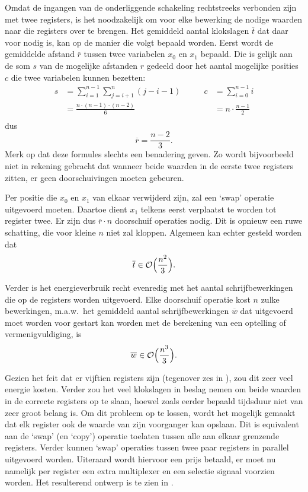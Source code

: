 Omdat de ingangen van de onderliggende schakeling rechtstreeks verbonden zijn met twee registers, is het noodzakelijk om voor elke bewerking de nodige waarden naar die registers over te brengen. Het gemiddeld aantal klokslagen $\overline{t}$ dat daar voor nodig is, kan op de manier die volgt bepaald worden. Eerst wordt de gemiddelde afstand $\overline{r}$ tussen twee variabelen $x_0$ en $x_1$ bepaald. Die is gelijk aan de som $s$ van de mogelijke afstanden $r$ gedeeld door het aantal mogelijke posities $c$ die twee variabelen kunnen bezetten:
\[\begin{aligned}
s	&= \sum_{i = 1}^{n - 1} \sum_{j = i + 1}^n (j - i - 1)
	&\qquad c	&= \sum_{i = 0}^{n - 1} i\\
	&= \frac{n \cdot (n - 1) \cdot (n - 2)}{6}
	&	&= n \cdot \frac{n - 1}{2}\\
\end{aligned}\]
dus
\[\overline{r}	= \frac{n - 2}{3}.\]
Merk op dat deze formules slechts een benadering geven. Zo wordt bijvoorbeeld niet in rekening gebracht dat wanneer beide waarden in de eerste twee registers zitten, er geen doorschuivingen moeten gebeuren.

Per positie die $x_0$ en $x_1$ van elkaar verwijderd zijn, zal een `swap' operatie uitgevoerd moeten. Daartoe dient $x_1$ telkens eerst verplaatst te worden tot register twee. Er zijn dus $\overline{r} \cdot n$ doorschuif operaties nodig. Dit is opnieuw een ruwe schatting, die voor kleine $n$ niet zal kloppen. Algemeen kan echter gesteld worden dat
\[\overline{t} \in \mathcal{O} \Bigl( \frac{n^2}{3} \Bigr).\]

Verder is het energieverbruik recht evenredig met het aantal schrijfbewerkingen die op de registers worden uitgevoerd. Elke doorschuif operatie kost $n$ zulke bewerkingen, m.a.w.\ het gemiddeld aantal schrijfbewerkingen $\overline{w}$ dat uitgevoerd moet worden voor gestart kan worden met de berekening van een optelling of vermenigvuldiging, is
\[\overline{w} \in \mathcal{O} \Bigl( \frac{n^3}{3} \Bigr).\]

Gezien het feit dat er vijftien registers zijn (tegenover zes in \cite{lee}), zou dit zeer veel energie kosten. Verder zou het veel klokslagen in beslag nemen om beide waarden in de correcte registers op te slaan, hoewel zoals eerder bepaald tijdsduur niet van zeer groot belang is. Om dit probleem op te lossen, wordt het mogelijk gemaakt dat elk register ook de waarde van zijn voorganger kan opslaan. Dit is equivalent aan de `swap' (en `copy') operatie toelaten tussen alle aan elkaar grenzende registers. Verder kunnen `swap' operaties tussen twee paar registers in parallel uitgevoerd worden. Uiteraard wordt hiervoor een prijs betaald, er moet nu namelijk per register een extra multiplexer en een selectie signaal voorzien worden.  Het resulterend ontwerp is te zien in .

